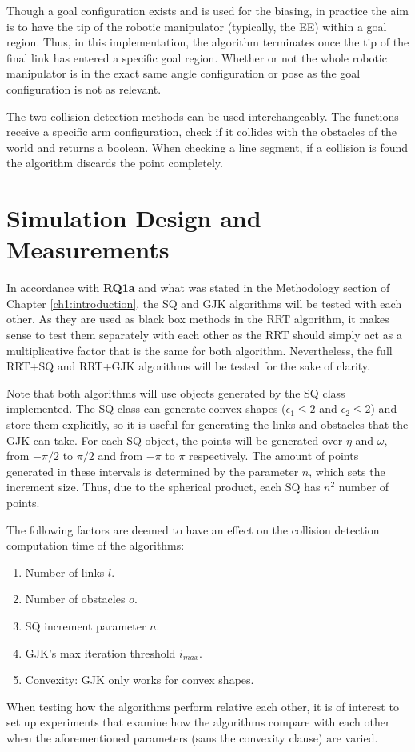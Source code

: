 Though a goal configuration exists and is used for the biasing, in practice the aim is to have the tip of the robotic manipulator (typically, the \gls{EE}) within a goal region. Thus, in this implementation, the algorithm terminates once the tip of the final link has entered a specific goal region. Whether or not the whole robotic manipulator is in the exact same angle configuration or pose as the goal configuration is not as relevant.

The two collision detection methods can be used interchangeably. The functions receive a specific arm configuration, check if it collides with the obstacles of the world and returns a boolean. When checking a line segment, if a collision is found the algorithm discards the point completely. %

\section{Simulation Design and Measurements}

In accordance with \textbf{RQ1a} and what was stated in the Methodology section of Chapter \ref{ch1:introduction}, the \gls{SQ} and \gls{GJK} algorithms will be tested with each other. As they are used as black box methods in the \gls{RRT} algorithm, it makes sense to test them separately with each other as the \gls{RRT} should simply act as a multiplicative factor that is the same for both algorithm. Nevertheless, the full \gls{RRT}+\gls{SQ} and \gls{RRT}+\gls{GJK} algorithms will be tested for the sake of clarity.

Note that both algorithms will use objects generated by the \gls{SQ} class implemented. The \gls{SQ} class can generate convex shapes ($\epsilon_1 \leq 2$ and $\epsilon_2 \leq 2$) and store them explicitly, so it is useful for generating the links and obstacles that the \gls{GJK} can take. For each \gls{SQ} object, the points will be generated over $\eta$ and $\omega$, from $-\pi/2$ to $\pi/2$ and from $-\pi$ to $\pi$ respectively. The amount of points generated in these intervals is determined by the parameter $n$, which sets the increment size. Thus, due to the spherical product, each \gls{SQ} has $n^2$ number of points.

The following factors are deemed to have an effect on the collision detection computation time of the algorithms:
\begin{enumerate}
	\item Number of links $l$.
	\item Number of obstacles $o$.
	\item \gls{SQ} increment parameter $n$.
	\item \gls{GJK}'s max iteration threshold $i_{max}$.
	\item Convexity: \gls{GJK} only works for convex shapes.
\end{enumerate}

When testing how the algorithms perform relative each other, it is of interest to set up experiments that examine how the algorithms compare with each other when the aforementioned parameters (sans the convexity clause) are varied. 
